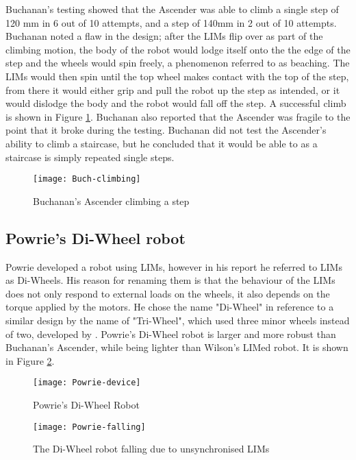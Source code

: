 Buchanan's testing showed that the Ascender was able to climb a single step of 120 mm in 6 out of 10 attempts, and a step of 140mm in 2 out of 10 attempts. Buchanan noted a flaw in the design; after the LIMs flip over as part of the climbing motion, the body of the robot would lodge itself onto the the edge of the step and the wheels would spin freely, a phenomenon referred to as beaching. The LIMs would then spin until the top wheel makes contact with the top of the step, from there it would either grip and pull the robot up the step as intended, or it would dislodge the body and the robot would fall off the step. A successful climb is shown in Figure \ref{Buch climbing}. Buchanan also reported that the Ascender was fragile to the point that it broke during the testing. Buchanan did not test the Ascender's ability to climb a staircase, but he concluded that it would be able to as a staircase is simply repeated single steps. \citep{Buchanan-2018}
\newpage
\begin{figure}[h]
	\centering
	\texttt{[image: Buch-climbing]}
	\caption{Buchanan's Ascender climbing a step \citep{Buchanan-2018}}
	\label{Buch climbing}
\end{figure}

\newpage
\subsection{Powrie's Di-Wheel robot}

Powrie developed a robot using LIMs, however in his report he referred to LIMs as Di-Wheels. His reason for renaming them is that the behaviour of the LIMs does not only respond to external loads on the wheels, it also depends on the torque applied by the motors. He chose the name "Di-Wheel" in reference to a similar design by the name of "Tri-Wheel", which used three minor wheels instead of two, developed by \cite{Smith-2015}. Powrie's Di-Wheel robot is larger and more robust than Buchanan's Ascender, while being lighter than Wilson's LIMed robot. It is shown in Figure \ref{fig:Powrie robot}.\\

\begin{figure}[h]
	\centering
	\texttt{[image: Powrie-device]}
	\caption{Powrie's Di-Wheel Robot \citep{Powrie-2019}}
	\label{fig:Powrie robot}
\end{figure}

\begin{wrapfigure}{r}{0.35\textwidth} %
	\centering
	\texttt{[image: Powrie-falling]}
	\caption{The Di-Wheel robot falling due to unsynchronised LIMs \citep{Powrie-2019}}
	\label{Powrie falling}
\end{wrapfigure}



